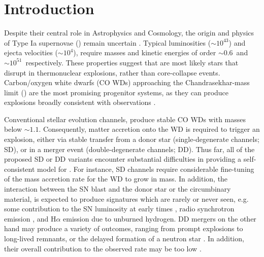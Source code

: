 \documentclass{aa}
\begin{document}

\maketitle

\section{Introduction} \label{sec:intro}

 Despite their central role in Astrophysics and Cosmology, 
 the origin and physics of Type Ia supernovae (\ias)
remain uncertain  \citep[][]{Maoz:2013hna}. 
Typical \ia  luminosities ($\sim 10^{43}$\ergs) and ejecta velocities  
($ \sim 10^{4}$\kms), require   
masses and kinetic energies of order 
$\sim 0.6$\msun\ and $\sim 10^{51}$\erg\ respectively. 
 These properties suggest that \ias are most likely 
 stars that disrupt in  thermonuclear explosions, 
 rather than core-collapse events. 
 Carbon/oxygen white dwarfs (CO WDs) 
 approaching the Chandrasekhar-mass limit (\mch)
 are the most promising progenitor systems, as they can 
 produce explosions broadly consistent with observations
 \citep{Nomoto:1982zz,Churazov:2014bga}. %
 
Conventional stellar evolution channels, produce stable CO WDs with masses below $\sim 1.1$\msun. 
Consequently, matter accretion onto the WD is required to trigger an 
explosion, either via stable  transfer from a 
donor star (single-degenerate channels; SD), or in a 
merger event (double-degenerate channels; DD).  
Thus far, all of the proposed SD or DD variants    
encounter substantial difficulties in providing 
a self-consistent model for \ias \citep{Livio:2018rue}. 
For instance, SD channels require considerable fine-tuning
of the mass accretion rate for
the WD to grow in mass. In addition, the interaction between  
the SN blast and the donor star or the circumbinary material, is expected to produce  signatures which 
are rarely or never seen, e.g. some contribution to the SN  luminosity 
at early times \citep{Kasen:2009si}, radio synchrotron emission 
\citep{Harris:2016hfr}, and H$\alpha$ emission due to unburned hydrogen. 
DD mergers on the other hand may produce a variety of outcomes, 
ranging from prompt 
explosions to long-lived remnants, or the delayed formation of a neutron star \citep{Livio:2018rue}. In addition, their overall contribution to the observed \ia rate may be too low \citep{vanKerkwijk:2010he,claeys2014a,Sato:2015spa}. %
\end{document}
